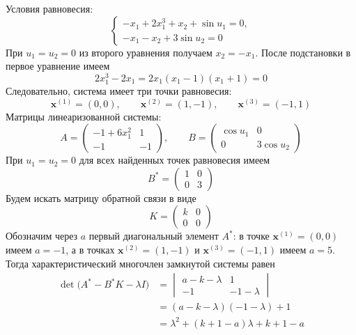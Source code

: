 Условия равновесия:
\begin{equation}
  \begin{cases}
    -x_1+2x_1^3+x_2+\sin u_1=0,\\
    -x_1-x_2+3\sin u_2=0
  \end{cases}
\end{equation}
При $u_1=u_2=0$ из второго уравнения получаем $x_2=-x_1$. После
подстановки в первое уравнение имеем
\begin{equation}
  2x_1^3-2x_1=2x_1(x_1-1)(x_1+1)=0
\end{equation}
Следовательно, система имеет три точки равновесия:
\begin{equation}
  \bm x^{(1)}=(0,0),\qquad
  \bm x^{(2)}=(1,-1),\qquad
  \bm x^{(3)}=(-1,1)
\end{equation}
Матрицы линеаризованной системы:
\begin{equation}
  A=
  \begin{pmatrix}
    -1+6x_1^2 & 1\\
    -1 & -1
  \end{pmatrix},
  \qquad
  B=
  \begin{pmatrix}
    \cos u_1 & 0\\
    0 & 3\cos u_2
  \end{pmatrix}
\end{equation}
При $u_1=u_2=0$ для всех найденных точек равновесия имеем
\begin{equation}
  B^*=
  \begin{pmatrix}
    1 & 0\\
    0 & 3
  \end{pmatrix}
\end{equation}
Будем искать матрицу обратной связи в виде
\begin{equation}
  K=
  \begin{pmatrix}
    k & 0\\
    0 & 0
  \end{pmatrix}
\end{equation}
Обозначим через $a$ первый диагональный элемент $A^*$: в точке
$\bm x^{(1)}=(0,0)$ имеем $a=-1$, а в точках
$\bm x^{(2)}=(1,-1)$ и $\bm x^{(3)}=(-1,1)$ имеем $a=5$.
Тогда характеристический многочлен замкнутой системы равен
\begin{equation}
  \begin{aligned}
    \det\bigl(A^*-B^*K-\lambda I\bigr)
    &=\begin{vmatrix}
      a-k-\lambda & 1\\
      -1 & -1-\lambda
    \end{vmatrix}\\
    &=(a-k-\lambda)(-1-\lambda)+1\\
    &=\lambda^2+(k+1-a)\lambda+k+1-a
  \end{aligned}
\end{equation}
